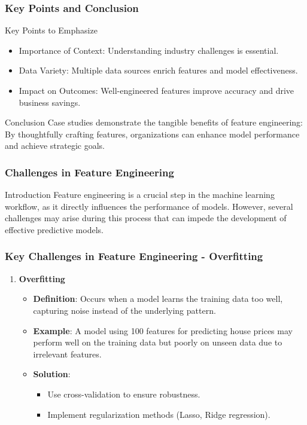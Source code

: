 \documentclass[aspectratio=169]{beamer}
\begin{document}
\begin{frame}[fragile]
    \frametitle{Key Points and Conclusion}
    \begin{block}{Key Points to Emphasize}
        \begin{itemize}
            \item Importance of Context: Understanding industry challenges is essential.
            \item Data Variety: Multiple data sources enrich features and model effectiveness.
            \item Impact on Outcomes: Well-engineered features improve accuracy and drive business savings.
        \end{itemize}
    \end{block}

    \begin{block}{Conclusion}
        Case studies demonstrate the tangible benefits of feature engineering:
        By thoughtfully crafting features, organizations can enhance model performance and achieve strategic goals.
    \end{block}
\end{frame}

\begin{frame}[fragile]
    \frametitle{Challenges in Feature Engineering}
    \begin{block}{Introduction}
        Feature engineering is a crucial step in the machine learning workflow, as it directly influences the performance of models. However, several challenges may arise during this process that can impede the development of effective predictive models.
    \end{block}
\end{frame}

\begin{frame}[fragile]
    \frametitle{Key Challenges in Feature Engineering - Overfitting}
    \begin{enumerate}
        \item \textbf{Overfitting}
        \begin{itemize}
            \item \textbf{Definition}: Occurs when a model learns the training data too well, capturing noise instead of the underlying pattern.
            \item \textbf{Example}: A model using 100 features for predicting house prices may perform well on the training data but poorly on unseen data due to irrelevant features.
            \item \textbf{Solution}:
            \begin{itemize}
                \item Use cross-validation to ensure robustness.
                \item Implement regularization methods (Lasso, Ridge regression).
            \end{itemize}
        \end{itemize}
    \end{enumerate}
\end{frame}
\end{document}
